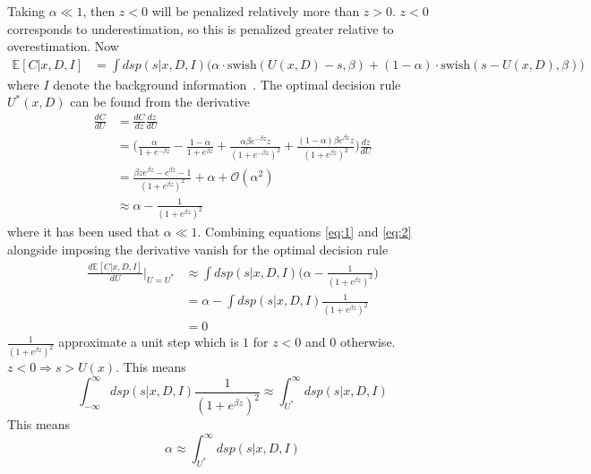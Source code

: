 \documentclass[a4paper,11pt, oneside]{article}
\theoremstyle{definition}
\begin{document}
	Taking $\alpha \ll 1$, then $z<0$ will be penalized relatively more than $z>0$. $z<0$ corresponds to underestimation, so this is penalized greater relative to overestimation. Now
	\begin{equation}
		\begin{split}
			\mathbb{E}[C|x,D,I] & =\int ds p(s|x,D,I) \bigg(\alpha\cdot \text{swish}(U(x,D)-s,\beta)+(1-\alpha)\cdot\text{swish}(s-U(x,D),\beta)\bigg)
		\end{split}
		\label{eq:1}
	\end{equation}
	where $I$ denote the background information~\citep{Sivia2006}. The optimal decision rule $U^*(x,D)$ can be found from the derivative
	\begin{equation}
		\begin{split}
			\frac{dC}{dU} & = \frac{dC}{dz}\frac{dz}{dU}\\
			& = \bigg(\frac{\alpha}{1+e^{-\beta z}}-\frac{1-\alpha}{1+e^{\beta z}}+\frac{\alpha\beta e^{-\beta z}z}{(1+e^{-\beta z})^2}+\frac{(1-\alpha)\beta e^{\beta z}z}{(1+e^{\beta z})^2}\bigg)\frac{dz}{dU}\\
			&= \frac{\beta z e^{\beta z}-e^{\beta z}-1}{(1+e^{\beta z})^2}+\alpha+\mathcal{O}(\alpha^2)\\
			&\approx  \alpha -\frac{1}{(1+e^{\beta z})^2}
		\end{split}
		\label{eq:2}
	\end{equation}
	where it has been used that $\alpha\ll 1$. Combining equations \eqref{eq:1} and \eqref{eq:2} alongside imposing the derivative vanish for the optimal decision rule
	\begin{equation}
		\begin{split}
			\frac{d\mathbb{E}[C|x,D,I ]}{dU}\bigg|_{U=U^*} &\approx \int ds p(s|x,D,I) \bigg(\alpha -\frac{1}{(1+e^{\beta z})^2}\bigg)\\
			& = \alpha -\int ds p(s|x,D,I)\frac{1}{(1+e^{\beta z})^2}\\
			& = 0
		\end{split}
	\end{equation}
	$\frac{1}{(1+e^{\beta z})^2}$ approximate a unit step which is $1$ for $z<0$ and $0$ otherwise. $z<0 \Rightarrow s>U(x)$. This means
	\begin{equation}
		\int_{-\infty}^{\infty} ds p(s|x,D,I)\frac{1}{(1+e^{\beta z})^2} \approx \int_{U^*}^{\infty} ds p(s|x,D,I)
	\end{equation}
	This means
	\begin{equation}
		\alpha \approx \int_{U^*}^{\infty} ds p(s|x,D,I)
		\label{eq:decision}
	\end{equation}
\end{document}
